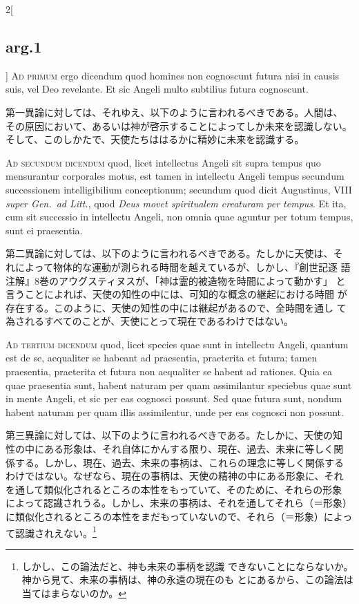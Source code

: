 \documentclass[paper=a4paper,fontsize=10pt,jafontsize=9pt,titlepage]{jlreq}
\begin{document}
\begin{paracol}{2}[\subsection{arg.1}]
{\scshape Ad primum} ergo dicendum quod homines non cognoscunt futura
nisi in causis suis, vel Deo revelante. Et sic Angeli multo subtilius
futura cognoscunt.

\switchcolumn

第一異論に対しては、それゆえ、以下のように言われるべきである。人間は、
その原因において、あるいは神が啓示することによってしか未来を認識しない。
そして、このしかたで、天使たちははるかに精妙に未来を認識する。

\switchcolumn*[\subsection{ad.2}]

{\scshape Ad secundum dicendum} quod, licet intellectus Angeli sit
supra tempus quo mensurantur corporales motus, est tamen in intellectu
Angeli tempus secundum successionem intelligibilium conceptionum;
secundum quod dicit Augustinus, VIII {\itshape super Gen.~ad Litt.},
quod {\itshape Deus movet spiritualem creaturam per tempus}. Et ita,
cum sit successio in intellectu Angeli, non omnia quae aguntur per
totum tempus, sunt ei praesentia.

\switchcolumn

第二異論に対しては、以下のように言われるべきである。たしかに天使は、そ
れによって物体的な運動が測られる時間を越えているが、しかし、『創世記逐
語注解』8巻のアウグスティヌスが、「神は霊的被造物を時間によって動かす」
と言うことによれば、天使の知性の中には、可知的な概念の継起における時間
が存在する。このように、天使の知性の中には継起があるので、全時間を通し
て為されるすべてのことが、天使にとって現在であるわけではない。

\switchcolumn*[\subsection{ad.3}]

{\scshape Ad tertium dicendum} quod, licet species quae sunt in
intellectu Angeli, quantum est de se, aequaliter se habeant ad
praesentia, praeterita et futura; tamen praesentia, praeterita et
futura non aequaliter se habent ad rationes. Quia ea quae praesentia
sunt, habent naturam per quam assimilantur speciebus quae sunt in
mente Angeli, et sic per eas cognosci possunt. Sed quae futura sunt,
nondum habent naturam per quam illis assimilentur, unde per eas
cognosci non possunt.

\switchcolumn

第三異論に対しては、以下のように言われるべきである。たしかに、天使の知
性の中にある形象は、それ自体にかんする限り、現在、過去、未来に等しく関
係する。しかし、現在、過去、未来の事柄は、これらの理念に等しく関係する
わけではない。なぜなら、現在の事柄は、天使の精神の中にある形象に、それ
を通して類似化されるところの本性をもっていて、そのために、それらの形象
によって認識されうる。しかし、未来の事柄は、それを通してそれら（＝形象）
に類似化されるところの本性をまだもっていないので、それら（＝形象）によっ
て認識されえない。\footnote{しかし、この論法だと、神も未来の事柄を認識
できないことにならないか。神から見て、未来の事柄は、神の永遠の現在のも
とにあるから、この論法は当てはまらないのか。}


\end{paracol}
\end{document}

